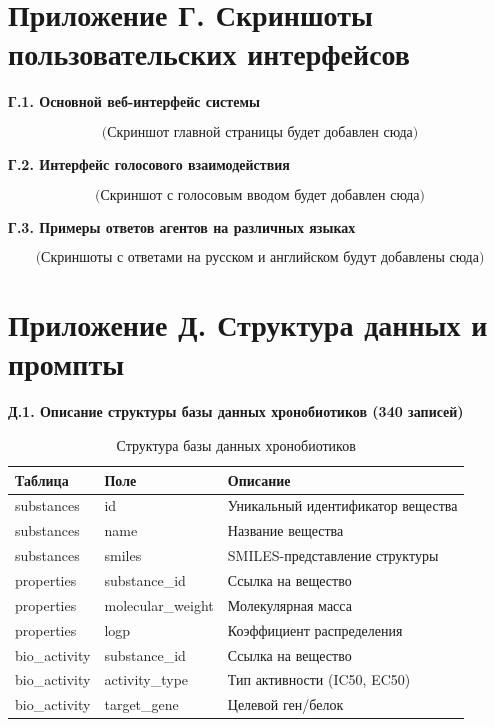 \documentclass[a4paper,14pt]{extarticle}
\begin{document}
	\section*{Приложение Г. Скриншоты пользовательских интерфейсов}
	
	\begin{center}
		\textbf{Г.1. Основной веб-интерфейс системы}
	\end{center}
	
	\[
	\text{(Скриншот главной страницы будет добавлен сюда)}
	\]
	
	\begin{center}
		\textbf{Г.2. Интерфейс голосового взаимодействия}
	\end{center}
	
	\[
	\text{(Скриншот с голосовым вводом будет добавлен сюда)}
	\]
	
	\begin{center}
		\textbf{Г.3. Примеры ответов агентов на различных языках}
	\end{center}
	
	\[
	\text{(Скриншоты с ответами на русском и английском будут добавлены сюда)}
	\]
	
	\section*{Приложение Д. Структура данных и промпты}
	
	\begin{center}
		\textbf{Д.1. Описание структуры базы данных хронобиотиков (340 записей)}
	\end{center}
	
	\begin{table}[h]
		\centering
		\fontsize{13pt}{15pt}\selectfont
		\begin{tabular}{|p{3cm}|p{3cm}|p{5cm}|}
			\hline
			\textbf{Таблица} & \textbf{Поле} & \textbf{Описание} \\
			\hline
			substances & id & Уникальный идентификатор вещества \\
			\hline
			substances & name & Название вещества \\
			\hline
			substances & smiles & SMILES-представление структуры \\
			\hline
			properties & substance\_id & Ссылка на вещество \\
			\hline
			properties & molecular\_weight & Молекулярная масса \\
			\hline
			properties & logp & Коэффициент распределения \\
			\hline
			bio\_activity & substance\_id & Ссылка на вещество \\
			\hline
			bio\_activity & activity\_type & Тип активности (IC50, EC50) \\
			\hline
			bio\_activity & target\_gene & Целевой ген/белок \\
			\hline
		\end{tabular}
		\caption{Структура базы данных хронобиотиков}
	\end{table}
	
\end{document}
